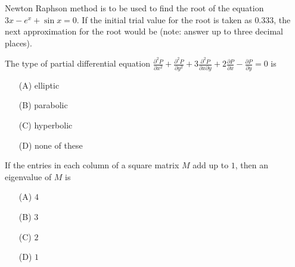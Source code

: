   \item Newton Raphson method is to be used to find the root of the equation $3x - e^x + \sin x = 0$. If the initial trial value for the root is taken as $0.333$, the next approximation for the root would be (note: answer up to three decimal places).
    
\item The type of partial differential equation 
    $ \frac{\partial^2 P}{\partial x^2} + \frac{\partial^2 P}{\partial y^2} + 3 \frac{\partial^2 P}{\partial x \partial y} + 2 \frac{\partial P}{\partial x} - \frac{\partial P}{\partial y} = 0 $
    is
    \begin{enumerate}
        \item[(A)] elliptic
        \item[(B)] parabolic
        \item[(C)] hyperbolic
        \item[(D)] none of these
    \end{enumerate}
    
    \item If the entries in each column of a square matrix $M$ add up to $1$, then an eigenvalue of $M$ is
    \begin{enumerate}
        \item[(A)] $4$
        \item[(B)] $3$
        \item[(C)] $2$
        \item[(D)] $1$
    \end{enumerate}
    





 
